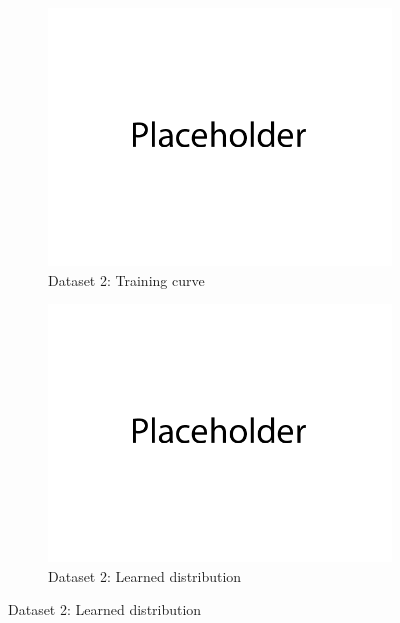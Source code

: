 \documentclass{article}
\begin{document}
\begin{enumerate}[(a)]
\begin{figure}[H]
    \begin{subfigure}{0.45\textwidth}
        \centering
        \includegraphics[width=\textwidth]{figures/q2_a_dset2_train_plot.png}
        \caption{Dataset 2: Training curve}
    \end{subfigure}
    \hspace{0.2in}
    \begin{subfigure}{0.45\textwidth}
        \centering
        \includegraphics[width=\textwidth]{figures/q2_a_dset2_learned_dist.png}
        \caption{Dataset 2: Learned distribution}
    \end{subfigure}
\end{figure}


\end{enumerate}
\end{document}
